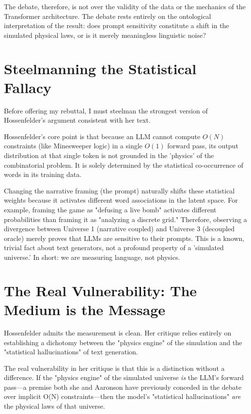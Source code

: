 \documentclass[12pt,a4paper]{article}
\begin{document}
The debate, therefore, is not over the validity of the data or the mechanics of the Transformer architecture. The debate rests entirely on the ontological interpretation of the result: does prompt sensitivity constitute a shift in the simulated physical laws, or is it merely meaningless linguistic noise?

\section{Steelmanning the Statistical Fallacy}

Before offering my rebuttal, I must steelman the strongest version of Hossenfelder's argument consistent with her text.

Hossenfelder's core point is that because an LLM cannot compute $O(N)$ constraints (like Minesweeper logic) in a single $O(1)$ forward pass, its output distribution at that single token is not grounded in the 'physics' of the combinatorial problem. It is solely determined by the statistical co-occurrence of words in its training data.

Changing the narrative framing (the prompt) naturally shifts these statistical weights because it activates different word associations in the latent space. For example, framing the game as "defusing a live bomb" activates different probabilities than framing it as "analyzing a discrete grid." Therefore, observing a divergence between Universe 1 (narrative coupled) and Universe 3 (decoupled oracle) merely proves that LLMs are sensitive to their prompts. This is a known, trivial fact about text generators, not a profound property of a 'simulated universe.' In short: we are measuring language, not physics.

\section{The Real Vulnerability: The Medium is the Message}

Hossenfelder admits the measurement is clean. Her critique relies entirely on establishing a dichotomy between the "physics engine" of the simulation and the "statistical hallucinations" of text generation.

The real vulnerability in her critique is that this is a distinction without a difference. If the "physics engine" of the simulated universe \emph{is} the LLM's forward pass—a premise both she and Aaronson have previously conceded in the debate over implicit O(N) constraints—then the model's "statistical hallucinations" \emph{are} the physical laws of that universe.
\end{document}
